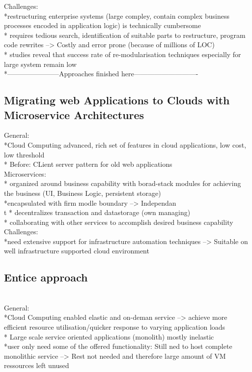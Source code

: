 Challenges:\\
*restructuring enterprise systems (large compley, contain complex business processes encoded in application logic) is technically cumbersome \\
* requires tedious search, identification of suitable parts to restructure, program code rewrites --> Costly and error prone (because of millions of LOC)\\
* studies reveal that success rate of re-modularisation techniques especially for large system remain low\\

*-----------------------Approaches finished here----------------------------\\

\subsection{Migrating web Applications to Clouds with Microservice Architectures}
\cite{MigratingCloud}

General: \\
*Cloud Computing advanced, rich set of features in cloud applications, low cost, low threshold\\
* Before: CLient server pattern for old web applications\\

Microservices:\\
* organized around business capability with borad-stack modules for achieving the business (UI, Business Logic, persistent storage)\\
*encapsulated with firm modle boundary --> Independan\\t
* decentralizes transaction and datastorage (own  managing)\\
* collaborating with other services to accomplish  desired business capability\\


Challenges:\\
*need extensive support for infrastructure automation techniques --> Suitable on well infrastructure supported cloud environment\\

\subsection{Entice approach}
\cite{EnticeApproach} \\

General:\\
*Cloud Computing enabled elastic and on-deman service --> achieve more efficient resource utilisation/quicker response to varying application loads\\
* Large scale service oriented applications (monolith) mostly inelastic\\
*user only need some of the offered functionality: Still ned to host complete monolithic service --> Rest not needed and therefore large amount of VM ressources left unused\\


